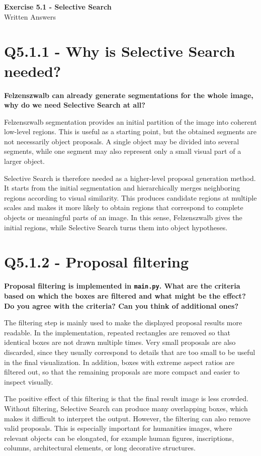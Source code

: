 \documentclass[11pt,a4paper]{article}
\begin{document}
\begin{center}
{\Large \textbf{Exercise 5.1 - Selective Search}}\\[0.5em]
{\normalsize Written Answers}
\end{center}

\section*{Q5.1.1 - Why is Selective Search needed?}
\textbf{Felzenszwalb can already generate segmentations for the whole image, why do we need Selective Search at all?}

Felzenszwalb segmentation provides an initial partition of the image into coherent low-level regions. This is useful as a starting point, but the obtained segments are not necessarily object proposals. A single object may be divided into several segments, while one segment may also represent only a small visual part of a larger object.

Selective Search is therefore needed as a higher-level proposal generation method. It starts from the initial segmentation and hierarchically merges neighboring regions according to visual similarity. This produces candidate regions at multiple scales and makes it more likely to obtain regions that correspond to complete objects or meaningful parts of an image. In this sense, Felzenszwalb gives the initial regions, while Selective Search turns them into object hypotheses.

\section*{Q5.1.2 - Proposal filtering}
\textbf{Proposal filtering is implemented in \texttt{main.py}. What are the criteria based on which the boxes are filtered and what might be the effect? Do you agree with the criteria? Can you think of additional ones?}

The filtering step is mainly used to make the displayed proposal results more readable. In the implementation, repeated rectangles are removed so that identical boxes are not drawn multiple times. Very small proposals are also discarded, since they usually correspond to details that are too small to be useful in the final visualization. In addition, boxes with extreme aspect ratios are filtered out, so that the remaining proposals are more compact and easier to inspect visually.

The positive effect of this filtering is that the final result image is less crowded. Without filtering, Selective Search can produce many overlapping boxes, which makes it difficult to interpret the output. However, the filtering can also remove valid proposals. This is especially important for humanities images, where relevant objects can be elongated, for example human figures, inscriptions, columns, architectural elements, or long decorative structures.
\end{document}
